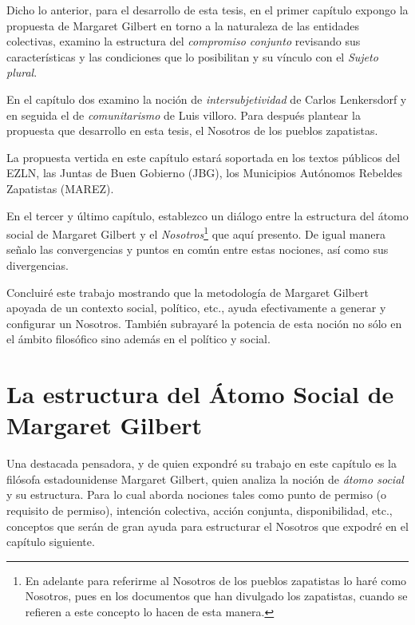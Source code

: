 \documentclass[oneside]{book}
\begin{document}
Dicho lo anterior, para el desarrollo de esta tesis, en el primer capítulo expongo la propuesta de Margaret Gilbert en torno a la naturaleza de las entidades colectivas, examino la estructura del \textit{compromiso conjunto} revisando sus características y las condiciones que lo posibilitan y su vínculo con el \textit{Sujeto plural}.

En el capítulo dos examino la noción de \textit{intersubjetividad} de Carlos Lenkersdorf y en seguida el de \textit{comunitarismo} de Luis villoro. Para después plantear la propuesta que desarrollo en esta tesis, el Nosotros de los pueblos zapatistas.

La propuesta vertida en este capítulo estará soportada en los textos públicos del EZLN, las Juntas de Buen Gobierno (JBG), los Municipios Autónomos Rebeldes Zapatistas (MAREZ). 
	
En el tercer y último capítulo, establezco un diálogo entre la estructura del átomo social de Margaret Gilbert y el \textit{Nosotros}\footnote{En adelante para referirme al Nosotros de los pueblos zapatistas lo haré como Nosotros, pues en los documentos que han divulgado los zapatistas, cuando se refieren a este concepto lo hacen de esta manera.} que aquí presento. De igual manera señalo las convergencias y puntos en común entre estas nociones, así como sus divergencias.

Concluiré este trabajo mostrando que la metodología de Margaret Gilbert apoyada de un contexto social, político, etc., ayuda efectivamente a generar y configurar un Nosotros. También subrayaré la potencia de esta noción no sólo en el ámbito filosófico sino además en el político y social. 

\chapter{La estructura del Átomo Social de Margaret Gilbert}

Una destacada pensadora, y de quien expondré su trabajo en este capítulo es la filósofa estadounidense Margaret Gilbert, quien analiza la noción de \textit{átomo social} y su estructura. Para lo cual aborda nociones tales como punto de permiso (o requisito de permiso), intención colectiva, acción conjunta, disponibilidad, etc., conceptos que serán de gran ayuda para estructurar el Nosotros que expodré en el capítulo siguiente. 
\end{document}
